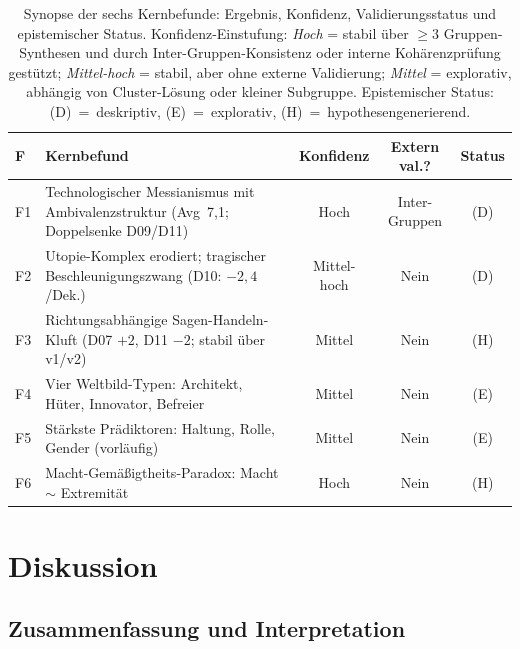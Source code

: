 \documentclass[12pt,a4paper]{article}
\begin{document}
\begin{table}[htbp]
  \centering
  \caption{Synopse der sechs Kernbefunde: Ergebnis, Konfidenz, Validierungsstatus und epistemischer Status. Konfidenz-Einstufung: \emph{Hoch} = stabil über $\geq 3$ Gruppen-Synthesen und durch Inter-Gruppen-Konsistenz oder interne Kohärenzprüfung gestützt; \emph{Mittel-hoch} = stabil, aber ohne externe Validierung; \emph{Mittel} = explorativ, abhängig von Cluster-Lösung oder kleiner Subgruppe. Epistemischer Status: (D)~=~deskriptiv, (E)~=~explorativ, (H)~=~hypothesengenerierend.}
  \label{tab:synopse}
  \footnotesize
  \begin{tabularx}{\textwidth}{l Y c c c}
    \toprule
    \textbf{F} & \textbf{Kernbefund} & \textbf{Konfidenz} & \textbf{Extern val.?} & \textbf{Status} \\
    \midrule
    F1 & Technologischer Messianismus mit Ambivalenzstruktur (Avg~7,1; Doppelsenke D09/D11) & Hoch & Inter-Gruppen & (D) \\
    \addlinespace[3pt]
    F2 & Utopie-Komplex erodiert; tragischer Beschleunigungszwang (D10: $-2{,}4$/Dek.) & Mittel-hoch & Nein & (D) \\
    \addlinespace[3pt]
    F3 & Richtungsabhängige Sagen-Handeln-Kluft (D07 $+2$, D11 $-2$; stabil über v1/v2) & Mittel & Nein & (H) \\
    \addlinespace[3pt]
    F4 & Vier Weltbild-Typen: Architekt, Hüter, Innovator, Befreier & Mittel & Nein & (E) \\
    \addlinespace[3pt]
    F5 & Stärkste Prädiktoren: Haltung, Rolle, Gender (vorläufig) & Mittel & Nein & (E) \\
    \addlinespace[3pt]
    F6 & Macht-Gemäßigtheits-Paradox: Macht $\sim$ Extremität & Hoch & Nein & (H) \\
    \bottomrule
  \end{tabularx}
\end{table}


\section{Diskussion}
\label{sec:diskussion}

\subsection{Zusammenfassung und Interpretation}
\label{sec:diskussion:zusammenfassung}
\end{document}

